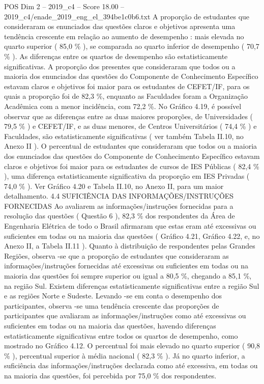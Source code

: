 \begin{textsample}{POS Dim 2 – 2019\_c4 – Score 18.00 – 2019\_c4/enade\_2019\_eng\_el\_394be1c0b6.txt}
A proporção de estudantes que consideraram os enunciados das questões claros e objetivos apresenta uma tendência crescente em relação ao aumento de desempenho : mais elevada no quarto superior ( 85,0 \% ), se comparada ao quarto inferior de desempenho ( 70,7 \% ).
As diferenças entre os quartos de desempenho são estatisticamente significativas.
A proporção dos presentes que consideraram que todos ou a maioria dos enunciados das questões do Componente de Conhecimento Específico estavam claros e objetivos foi maior para os estudantes de CEFET/IF, para os quais a proporção foi de 82,3 \%, enquanto as Faculdades foram a Organização Acadêmica com a menor incidência, com 72,2 \%.
No Gráfico 4.19, é possível observar que as diferenças entre as duas maiores proporções, de Universidades ( 79,5 \% ) e CEFET/IF, e as duas menores, de Centros Universitários ( 74,4 \% ) e Faculdades, são estatisticamente significativas ( ver também Tabela II.10, no Anexo II ).
O percentual de estudantes que consideraram que todos ou a maioria dos enunciados das questões do Componente de Conhecimento Específico estavam claros e objetivos foi maior para os estudantes de cursos de IES Públicas ( 82,4 \% ), uma diferença estatisticamente significativa da proporção em IES Privadas ( 74,0 \% ).
Ver Gráfico 4.20 e Tabela II.10, no Anexo II, para um maior detalhamento. 4.4 SUFICIÊNCIA DAS INFORMAÇÕES/INSTRUÇÕES FORNECIDAS Ao avaliarem as informações/instruções fornecidas para a resolução das questões ( Questão 6 ), 82,3 \% dos respondentes da Área de Engenharia Elétrica de todo o Brasil afirmaram que estas eram até excessivas ou suficientes em todas ou na maioria das questões ( Gráfico 4.21, Gráfico 4.22, e, no Anexo II, a Tabela II.11 ).
Quanto à distribuição de respondentes pelas Grandes Regiões, observa -se que a proporção de estudantes que consideraram as informações/instruções fornecidas até excessivas ou suficientes em todas ou na maioria das questões foi sempre superior ou igual a 80,5 \%, chegando a 85,1 \%, na região Sul.
Existem diferenças estatisticamente significativas entre a região Sul e as regiões Norte e Sudeste.
Levando -se em conta o desempenho dos participantes, observa -se uma tendência crescente das proporções de participantes que avaliaram as informações/instruções como até excessivas ou suficientes em todas ou na maioria das questões, havendo diferenças estatisticamente significativas entre todos os quartos de desempenho, como mostrado no Gráfico 4.12.
O percentual foi mais elevado no quarto superior ( 90,8 \% ), percentual superior à média nacional ( 82,3 \% ).
Já no quarto inferior, a suficiência das informações/instruções declarada como até excessiva, em todas ou na maioria das questões, foi percebida por 75,0 \% dos respondentes.

\end{textsample}
